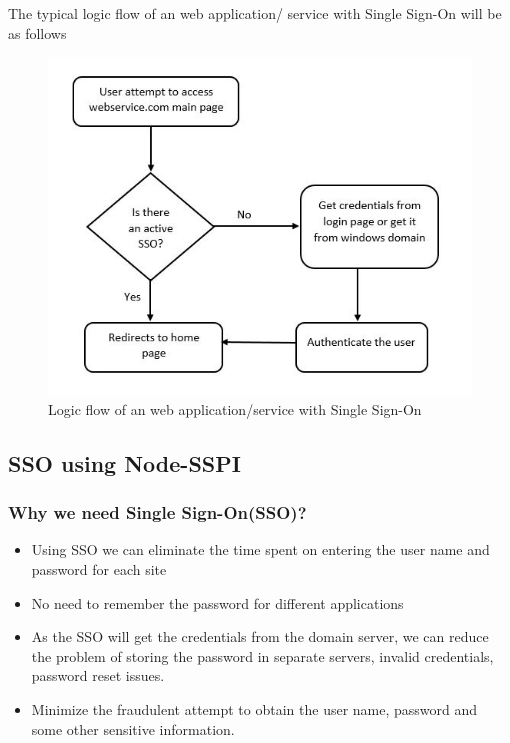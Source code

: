 \documentclass{report}
\begin{document}
The typical logic flow of an web application/ service with Single Sign-On will be as follows
\begin{figure}[h]
	\centerline{\includegraphics{SSOFlowChart1.jpg}}
	\caption{Logic flow of an web application/service with Single Sign-On}
	\label{Logic flow of an web application/service with Single Sign-On}
\end{figure}

\subsection*{SSO using Node-SSPI}
\subsubsection*{Why we need Single Sign-On(SSO)?}
\begin{itemize}
	\item{Using SSO we can eliminate the time spent on entering the user name and password for each site}
	\item{No need to remember the password for different applications}
	\item{As the SSO will get the credentials from the domain server, we can reduce the problem of storing the password in separate servers, invalid credentials, password reset issues.}
	\item{Minimize the fraudulent attempt to obtain the user name, password and some other sensitive information.}
\end{itemize}
\end{document}
